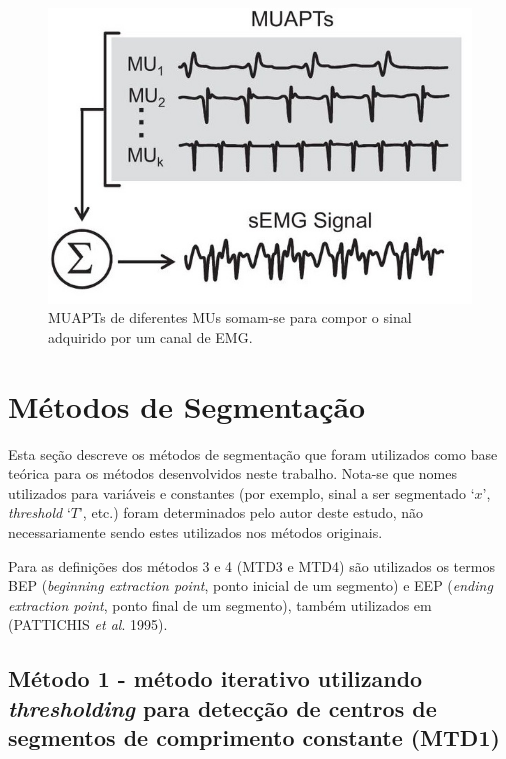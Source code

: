 \begin{figure}[!htb]
	\caption{\label{fig_MUAP_trains}MUAPTs de diferentes MUs somam-se para compor o sinal adquirido por um canal de EMG.}
	\begin{center}
	    \includegraphics[width=0.75\linewidth]{./img/MUAP_trains.jpg}
	\end{center}
\end{figure}

\section{Métodos de Segmentação}

Esta seção descreve os métodos de segmentação que foram utilizados como base teórica para os métodos desenvolvidos neste trabalho. Nota-se que nomes utilizados para variáveis e constantes (por exemplo, sinal a ser segmentado `$x$', \emph{threshold} `$T$', etc.) foram determinados pelo autor deste estudo, não necessariamente sendo estes utilizados nos métodos originais.

Para as definições dos métodos 3 e 4 (MTD3 e MTD4) são utilizados os termos BEP (\emph{beginning extraction point}, ponto inicial de um segmento) e EEP (\emph{ending extraction point}, ponto final de um segmento), também utilizados em (PATTICHIS \emph{et al}. 1995).
	
\subsection{Método 1 - método iterativo utilizando \emph{thresholding} para detecção de centros de segmentos de comprimento constante (MTD1)}

